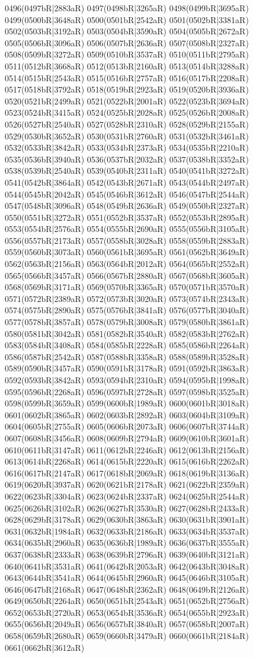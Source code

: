 0496(0497bR|2883aR) 0497(0498bR|3265aR) 0498(0499bR|3695aR) 0499(0500bR|3648aR) 0500(0501bR|2542aR) 0501(0502bR|3381aR) 0502(0503bR|3192aR) 0503(0504bR|3590aR) 0504(0505bR|2672aR) 0505(0506bR|3096aR) 0506(0507bR|2636aR) 0507(0508bR|2327aR) 0508(0509bR|3272aR) 0509(0510bR|3537aR) 0510(0511bR|2795aR) 0511(0512bR|3668aR) 0512(0513bR|2160aR) 0513(0514bR|3288aR) 0514(0515bR|2543aR) 0515(0516bR|2757aR) 0516(0517bR|2208aR) 0517(0518bR|3792aR) 0518(0519bR|2923aR) 0519(0520bR|3936aR) 0520(0521bR|2499aR) 0521(0522bR|2001aR) 0522(0523bR|3694aR) 0523(0524bR|3415aR) 0524(0525bR|2028aR) 0525(0526bR|2008aR) 0526(0527bR|2540aR) 0527(0528bR|2310aR) 0528(0529bR|2155aR) 0529(0530bR|3652aR) 0530(0531bR|2760aR) 0531(0532bR|3461aR) 0532(0533bR|3842aR) 0533(0534bR|2373aR) 0534(0535bR|2210aR) 0535(0536bR|3940aR) 0536(0537bR|2032aR) 0537(0538bR|3352aR) 0538(0539bR|2540aR) 0539(0540bR|2311aR) 0540(0541bR|3272aR) 0541(0542bR|3864aR) 0542(0543bR|2671aR) 0543(0544bR|2497aR) 0544(0545bR|2042aR) 0545(0546bR|3612aR) 0546(0547bR|2544aR) 0547(0548bR|3096aR) 0548(0549bR|2636aR) 0549(0550bR|2327aR) 0550(0551bR|3272aR) 0551(0552bR|3537aR) 0552(0553bR|2895aR) 0553(0554bR|2576aR) 0554(0555bR|2690aR) 0555(0556bR|3105aR) 0556(0557bR|2173aR) 0557(0558bR|3028aR) 0558(0559bR|2883aR) 0559(0560bR|3073aR) 0560(0561bR|3695aR) 0561(0562bR|3649aR) 0562(0563bR|2156aR) 0563(0564bR|2012aR) 0564(0565bR|2552aR) 0565(0566bR|3457aR) 0566(0567bR|2880aR) 0567(0568bR|3605aR) 0568(0569bR|3171aR) 0569(0570bR|3365aR) 0570(0571bR|3570aR) 0571(0572bR|2389aR) 0572(0573bR|3020aR) 0573(0574bR|2343aR) 0574(0575bR|2890aR) 0575(0576bR|3841aR) 0576(0577bR|3040aR) 0577(0578bR|3857aR) 0578(0579bR|3008aR) 0579(0580bR|3861aR) 0580(0581bR|3042aR) 0581(0582bR|3540aR) 0582(0583bR|2762aR) 0583(0584bR|3408aR) 0584(0585bR|2228aR) 0585(0586bR|2264aR) 0586(0587bR|2542aR) 0587(0588bR|3358aR) 0588(0589bR|3528aR) 0589(0590bR|3457aR) 0590(0591bR|3178aR) 0591(0592bR|3863aR) 0592(0593bR|3842aR) 0593(0594bR|2310aR) 0594(0595bR|1998aR) 0595(0596bR|2268aR) 0596(0597bR|2728aR) 0597(0598bR|3525aR) 0598(0599bR|3659aR) 0599(0600bR|1989aR) 0600(0601bR|3018aR) 0601(0602bR|3865aR) 0602(0603bR|2892aR) 0603(0604bR|3109aR) 0604(0605bR|2755aR) 0605(0606bR|2073aR) 0606(0607bR|3744aR) 0607(0608bR|3456aR) 0608(0609bR|2794aR) 0609(0610bR|3601aR) 0610(0611bR|3147aR) 0611(0612bR|2246aR) 0612(0613bR|2156aR) 0613(0614bR|2268aR) 0614(0615bR|2220aR) 0615(0616bR|2262aR) 0616(0617bR|2147aR) 0617(0618bR|2069aR) 0618(0619bR|3136aR) 0619(0620bR|3937aR) 0620(0621bR|2178aR) 0621(0622bR|2359aR) 0622(0623bR|3304aR) 0623(0624bR|2337aR) 0624(0625bR|2544aR) 0625(0626bR|3102aR) 0626(0627bR|3530aR) 0627(0628bR|2433aR) 0628(0629bR|3178aR) 0629(0630bR|3863aR) 0630(0631bR|3901aR) 0631(0632bR|1984aR) 0632(0633bR|2186aR) 0633(0634bR|3537aR) 0634(0635bR|2960aR) 0635(0636bR|1989aR) 0636(0637bR|3555aR) 0637(0638bR|2333aR) 0638(0639bR|2796aR) 0639(0640bR|3121aR) 0640(0641bR|3531aR) 0641(0642bR|2053aR) 0642(0643bR|3048aR) 0643(0644bR|3541aR) 0644(0645bR|2960aR) 0645(0646bR|3105aR) 0646(0647bR|2168aR) 0647(0648bR|2362aR) 0648(0649bR|2126aR) 0649(0650bR|2264aR) 0650(0651bR|2543aR) 0651(0652bR|2756aR) 0652(0653bR|2720aR) 0653(0654bR|3536aR) 0654(0655bR|2923aR) 0655(0656bR|2049aR) 0656(0657bR|3840aR) 0657(0658bR|2007aR) 0658(0659bR|2680aR) 0659(0660bR|3479aR) 0660(0661bR|2184aR) 0661(0662bR|3612aR) 